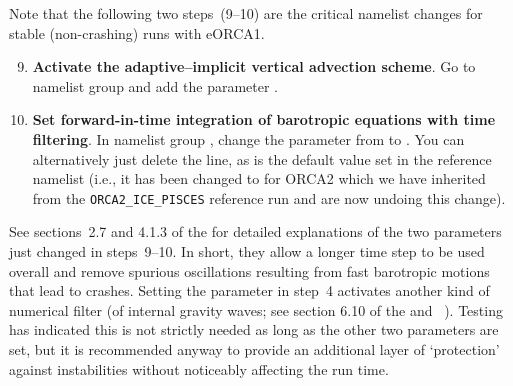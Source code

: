 \clearpage
Note that the following two steps~\mbox{(9--10)} are the critical namelist changes for stable (non-crashing) runs with eORCA1.

\begin{enumerate}\setcounter{enumi}{8}
    \item \textbf{Activate the adaptive--implicit vertical advection scheme}.
        Go to namelist group  and add the parameter .

    \item \textbf{Set forward-in-time integration of barotropic equations with time filtering}.
        In namelist group , change the parameter  from  to .
        You can alternatively just delete the line, as  is the default value set in the reference namelist (i.e., it has been changed to  for ORCA2 which we have inherited from the \mbox{\texttt{ORCA2_ICE_PISCES}} reference run and are now undoing this change).
\end{enumerate}

See sections~2.7 and 4.1.3 of the  for detailed explanations of the two parameters just changed in steps~\mbox{9--10}.
In short, they allow a longer time step to be used overall and remove spurious oscillations resulting from fast barotropic motions that lead to crashes.
Setting the parameter  in step~4 activates another kind of numerical filter (of internal gravity waves; see section 6.10 of the  and \citeauthor{shuman1971}~\citeyear{shuman1971}).
Testing has indicated this is not strictly needed as long as the other two parameters are set, but it is recommended anyway to provide an additional layer of `protection' against instabilities without noticeably affecting the run time.


